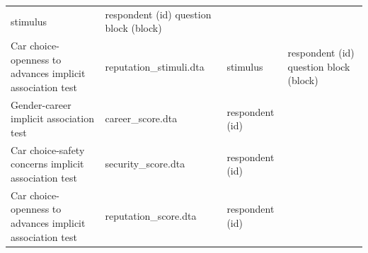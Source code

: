 \documentclass[
]{book}
\begin{document}
\begin{ex}
\begin{longtable}[]{@{}llll@{}}
\begin{minipage}[t]{0.32\columnwidth}
stimulus\strut
\end{minipage} & \begin{minipage}[t]{0.26\columnwidth}\raggedright
respondent (id) question block (block)\strut
\end{minipage}\tabularnewline
\begin{minipage}[t]{0.13\columnwidth}\raggedright
Car choice-openness to advances implicit association test\strut
\end{minipage} & \begin{minipage}[t]{0.18\columnwidth}\raggedright
reputation\_stimuli.dta\strut
\end{minipage} & \begin{minipage}[t]{0.32\columnwidth}\raggedright
stimulus\strut
\end{minipage} & \begin{minipage}[t]{0.26\columnwidth}\raggedright
respondent (id) question block (block)\strut
\end{minipage}\tabularnewline
\begin{minipage}[t]{0.13\columnwidth}\raggedright
Gender-career implicit association test\strut
\end{minipage} & \begin{minipage}[t]{0.18\columnwidth}\raggedright
career\_score.dta\strut
\end{minipage} & \begin{minipage}[t]{0.32\columnwidth}\raggedright
respondent (id)\strut
\end{minipage} & \begin{minipage}[t]{0.26\columnwidth}\raggedright
\strut
\end{minipage}\tabularnewline
\begin{minipage}[t]{0.13\columnwidth}\raggedright
Car choice-safety concerns implicit association test\strut
\end{minipage} & \begin{minipage}[t]{0.18\columnwidth}\raggedright
security\_score.dta\strut
\end{minipage} & \begin{minipage}[t]{0.32\columnwidth}\raggedright
respondent (id)\strut
\end{minipage} & \begin{minipage}[t]{0.26\columnwidth}\raggedright
\strut
\end{minipage}\tabularnewline
\begin{minipage}[t]{0.13\columnwidth}\raggedright
Car choice-openness to advances implicit association test\strut
\end{minipage} & \begin{minipage}[t]{0.18\columnwidth}\raggedright
reputation\_score.dta\strut
\end{minipage} & \begin{minipage}[t]{0.32\columnwidth}\raggedright
respondent (id)\strut
\end{minipage} & \begin{minipage}[t]{0.26\columnwidth}\raggedright
\strut
\end{minipage}\tabularnewline
\bottomrule
\end{longtable}


\end{ex}
\end{document}
